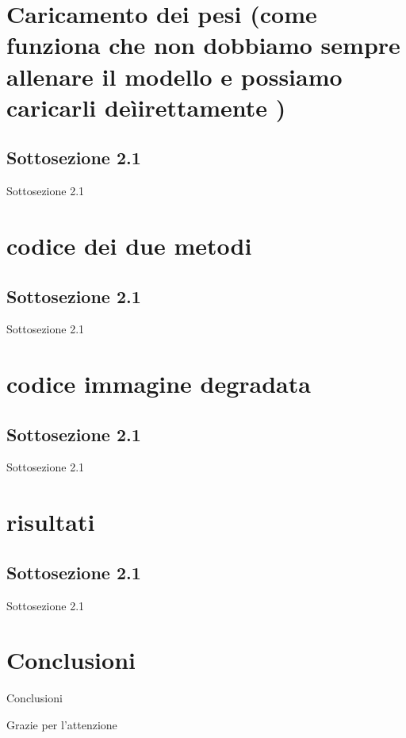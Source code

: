 \documentclass[11pt]{beamer}
\begin{document}
\section{Caricamento dei pesi (come funziona che non dobbiamo sempre allenare il modello e possiamo caricarli deìirettamente )}
\subsection{Sottosezione 2.1}
\begin{frame}{Sottosezione 2.1}
\end{frame}

\section{codice dei due metodi}
\subsection{Sottosezione 2.1}
\begin{frame}{Sottosezione 2.1}
\end{frame}

\section{codice immagine degradata}
\subsection{Sottosezione 2.1}
\begin{frame}{Sottosezione 2.1}
\end{frame}

\section{risultati}
\subsection{Sottosezione 2.1}
\begin{frame}{Sottosezione 2.1}
\end{frame}

\section{Conclusioni}
\begin{frame}{Conclusioni}
\end{frame}

\begin{frame}
  \centering
  {\Huge Grazie per l'attenzione}
\end{frame}
\end{document}
